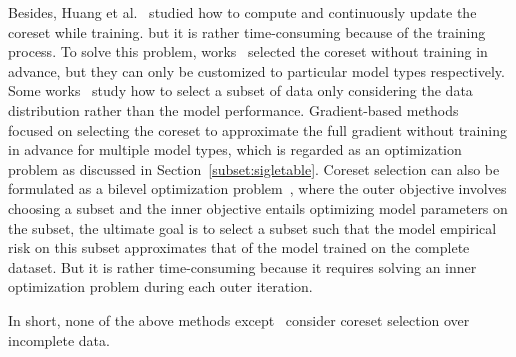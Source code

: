 %
Besides, 
  Huang et al.~\cite{DBLP:conf/icml/HuangHLFD21} studied how to compute and continuously update the coreset while training. %
but it is rather time-consuming because of the training process. 
 To solve this problem, works~\cite{DBLP:conf/icml/CampbellB18, DBLP:journals/corr/BravermanFL16}   selected the coreset without training in advance, but they can only be customized to particular model types respectively. %
 Some works~\cite{sener2017active,chen2012super} study how to select a subset of data only considering the data distribution rather than   the model performance.
 Gradient-based methods~\cite{DBLP:conf/icml/MirzasoleimanBL20,  recon, fastcore, DBLP:conf/emnlp/KirchhoffB14} focused on selecting the coreset to approximate the full gradient without training in advance for multiple model types, which is regarded as an optimization problem as discussed in Section~\ref{subset:sigletable}.
 Coreset selection can also be formulated as a bilevel optimization problem~\cite{borsos2020coresets, killamsetty2021retrieve}, where the outer objective involves choosing a subset and the inner objective entails optimizing model parameters on the subset, the ultimate goal is to select a subset such that the model empirical risk on this subset  approximates that of the model trained on the complete dataset. But it is rather time-consuming because it requires solving an inner optimization problem during each outer iteration. 
 
In short, none of the above methods except~\cite{goodcore}  consider coreset selection over incomplete data.


